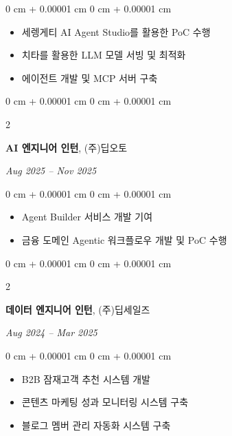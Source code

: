\documentclass[10pt, letterpaper]{article}
\newenvironment{highlights}{
    \begin{itemize}[
        topsep=0.10 cm,
        parsep=0.10 cm,
        partopsep=0pt,
        itemsep=0pt,
        leftmargin=0 cm + 10pt
    ]
}{
    \end{itemize}
} %
\newenvironment{onecolentry}{
    \begin{adjustwidth}{
        0 cm + 0.00001 cm
    }{
        0 cm + 0.00001 cm
    }
}{
    \end{adjustwidth}
} %
\newenvironment{twocolentry}[2][]{
    \onecolentry
    \def\secondColumn{\textit{#2}}
    \setcolumnwidth{\fill, 4.5 cm}
    \begin{paracol}{2}
}{
    \switchcolumn \raggedleft \secondColumn
    \end{paracol}
    \endonecolentry
} %
\begin{document}
        \vspace{0.10 cm}
        \begin{onecolentry}
            \begin{highlights}
                \item 세렝게티 AI Agent Studio를 활용한 PoC 수행
                \item 치타를 활용한 LLM 모델 서빙 및 최적화
                \item 에이전트 개발 및 MCP 서버 구축
            \end{highlights}
        \end{onecolentry}

        \vspace{0.2 cm}
        \begin{twocolentry}{
            Aug 2025 -- Nov 2025
        }
            \textbf{AI 엔지니어 인턴}, (주)딥오토
        \end{twocolentry}

        \vspace{0.10 cm}
        \begin{onecolentry}
            \begin{highlights}
                \item Agent Builder 서비스 개발 기여
                \item 금융 도메인 Agentic 워크플로우 개발 및 PoC 수행
            \end{highlights}
        \end{onecolentry}

        \vspace{0.2 cm}
        \begin{twocolentry}{
            Aug 2024 -- Mar 2025
        }
            \textbf{데이터 엔지니어 인턴}, (주)딥세일즈
        \end{twocolentry}

        \vspace{0.10 cm}
        \begin{onecolentry}
            \begin{highlights}
                \item B2B 잠재고객 추천 시스템 개발
                \item 콘텐츠 마케팅 성과 모니터링 시스템 구축
                \item 블로그 멤버 관리 자동화 시스템 구축
            \end{highlights}
        \end{onecolentry}
\end{document}
